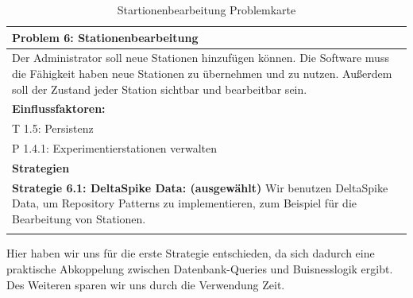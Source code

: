 \documentclass[enabledeprecatedfontcommands,fontsize=12pt,paper=a4,twoside]{scrartcl}
\begin{document}
\begin{table}[H]

    \centering
    \begin{tabular}{|p{15cm}|}
    \hline
          \textbf{Problem 6:} Stationenbearbeitung 
          \\ \hline
          Der Administrator soll neue Stationen hinzufügen können. Die Software muss die Fähigkeit haben neue Stationen zu übernehmen und zu nutzen. Außerdem soll der Zustand jeder Station sichtbar und bearbeitbar sein.
          \\ \hline
          \textbf{Einflussfaktoren: } \\
          T 1.5: Persistenz \\
          P 1.4.1: Experimentierstationen verwalten\\
          \hline
          \textbf{Strategien} \\ \hline
            {}          
           \label{strategie:6.1}     
          \textbf{Strategie 6.1: DeltaSpike Data: (ausgewählt)} Wir benutzen DeltaSpike Data, um Repository Patterns zu implementieren, zum Beispiel für die Bearbeitung von Stationen. \\
          \\ \hline
    \end{tabular}
    \caption{ Startionenbearbeitung Problemkarte}
    \label{tab:ProblemKarte6}
\end{table}
Hier haben wir uns für die erste Strategie entschieden, da sich dadurch eine praktische Abkoppelung zwischen Datenbank-Queries und Buisnesslogik ergibt. Des Weiteren sparen wir uns durch die Verwendung Zeit. \\
\end{document}
